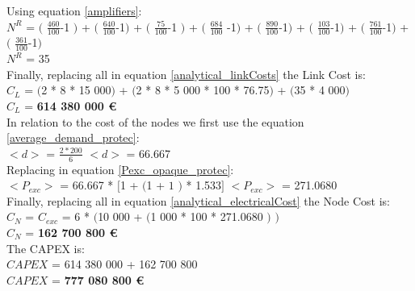 Using equation \ref{amplifiers}:\\

$N^R$ = $($ $\frac{460}{100}$-1 $)$ + $($ $\frac{640}{100}$-1$)$ + $($ $\frac{75}{100}$-1 $)$ + $($ $\frac{684}{100}$ -1$)$ + $($ $\frac{890}{100}$-1$)$ + $($ $\frac{103}{100}$-1$)$ + $($ $\frac{761}{100}$-1$)$ + $($ $\frac{361}{100}$-1$)$\\

$N^R$ = 35\\

Finally, replacing all in equation \ref{analytical_linkCosts} the Link Cost is:\\

$C_L$ = $($2 * 8 * 15 000$)$ + $($2 * 8 * 5 000 * 100 * 76.75$)$ + $($35 * 4 000$)$\\

$C_L$ = \textbf{614 380 000 \euro}\\

In relation to the cost of the nodes we first use the equation \ref{average_demand_protec}:\\

$<d>$ = $\frac{2 * 200}{6}$ \qquad \qquad $<d>$ = 66.667\\

Replacing in equation \ref{Pexc_opaque_protec}:\\

$<P_{exc}>$ = 66.667 * $[$1 + $($1 + $1$ $)$ * 1.533$]$ \qquad \quad $<P_{exc}>$ = 271.0680 \\

Finally, replacing all in equation \ref{analytical_electricalCost} the Node Cost is:\\

$C_N$ = $C_{exc}$ = 6 * $($10 000 + $($1 000 * 100 * 271.0680 $)$ $)$\\

$C_N$ = \textbf{162 700 800 \euro}\\

The CAPEX is:\\
$CAPEX$ = 614 380 000 + 162 700 800\\

$CAPEX$ = \textbf{777 080 800 \euro}\\

